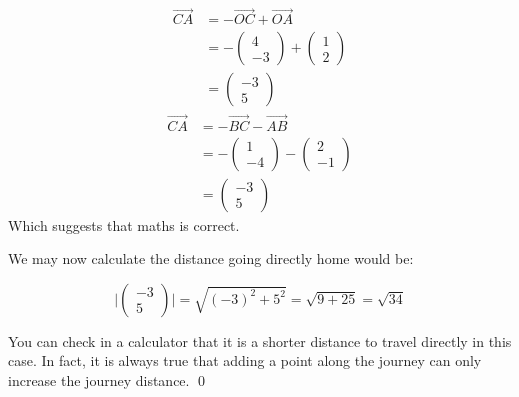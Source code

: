 \begin{solution}
    \begin{align*}
        \vec{CA} &= -\vec{OC} + \vec{OA} \\
        &= -\begin{pmatrix}4\\-3\end{pmatrix} + \begin{pmatrix}1\\2\end{pmatrix} \\
        &= \begin{pmatrix}-3\\5\end{pmatrix}
    \end{align*}
    \begin{align*}
        \vec{CA} &= -\vec{BC} - \vec{AB} \\
        &= -\begin{pmatrix}1\\-4\end{pmatrix} - \begin{pmatrix}2\\-1\end{pmatrix} \\
        &= \begin{pmatrix}-3\\5\end{pmatrix}
    \end{align*}
    Which suggests that maths is correct.

    We may now calculate the distance going directly home would be:

    \[ \vert \begin{pmatrix}-3\\5\end{pmatrix} \vert = \sqrt{(-3)^2 + 5^2} = \sqrt{9 + 25} = \sqrt{34}\]

    You can check in a calculator that it is a shorter distance to travel directly in this case. In fact, it is always true that adding a point along the journey can only increase the journey distance.
    \qed
\end{solution}

